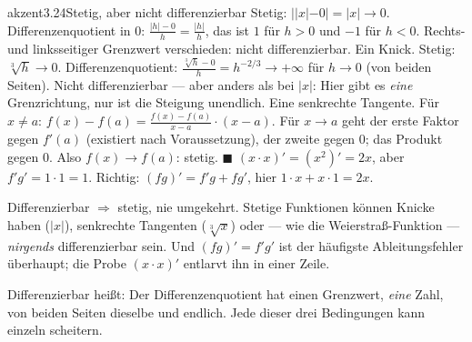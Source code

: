 \begin{loesungkarte}{akzent}{3.24}{Stetig, aber nicht differenzierbar}
Stetig: $||x| - 0|= |x|\to0$. Differenzenquotient in $0$: $\frac{|h| - 0}h = \frac{|h|}h$, das ist $1$ für $h > 0$ und $-1$ für $h < 0$. Rechts- und linksseitiger Grenzwert verschieden: nicht differenzierbar. Ein Knick.
Stetig: $\sqrt[3]h\to0$. Differenzenquotient: $\frac{\sqrt[3]h - 0}h = h^{-2/3}\to+\infty$ für $h\to0$ (von beiden Seiten). Nicht differenzierbar --- aber anders als bei $|x|$: Hier gibt es \emph{eine} Grenzrichtung, nur ist die Steigung unendlich. Eine senkrechte Tangente.
Für $x\neq a$: $f(x) - f(a) = \frac{f(x) - f(a)}{x - a}\cdot(x - a)$. Für $x\to a$ geht der erste Faktor gegen $f'(a)$ (existiert nach Voraussetzung), der zweite gegen $0$; das Produkt gegen $0$. Also $f(x)\to f(a)$: stetig. $\blacksquare$
$(x\cdot x)' = (x^{2})' = 2x$, aber $f'g' = 1\cdot1 = 1$. Richtig: $(fg)' = f'g + fg'$, hier $1\cdot x + x\cdot1 = 2x$. \checkmark
\begin{fehler}\kastentext
Differenzierbar $\Rightarrow$ stetig, nie umgekehrt. Stetige Funktionen können Knicke haben ($|x|$), senkrechte Tangenten ($\sqrt[3]x$) oder --- wie die Weierstraß-Funktion --- \emph{nirgends} differenzierbar sein. Und $(fg)' = f'g'$ ist der häufigste Ableitungsfehler überhaupt; die Probe $(x\cdot x)'$ entlarvt ihn in einer Zeile.
\end{fehler}
\begin{mitnehmen}\kastentext
Differenzierbar heißt: Der Differenzenquotient hat einen Grenzwert, \emph{eine} Zahl, von beiden Seiten dieselbe und endlich. Jede dieser drei Bedingungen kann einzeln scheitern.
\end{mitnehmen}
\end{loesungkarte}

